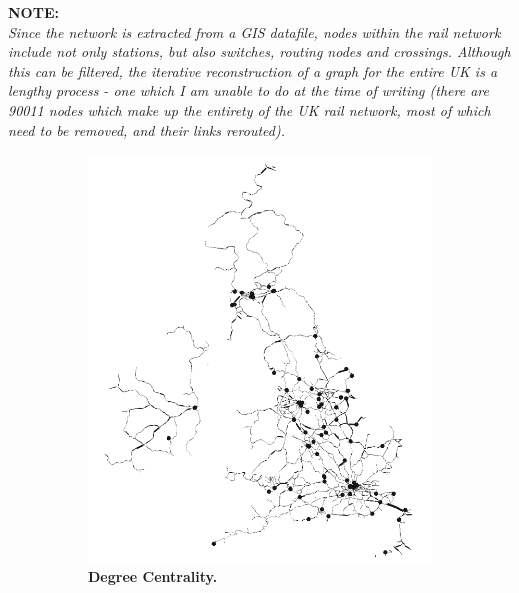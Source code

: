 \textbf{NOTE:}\\
\textit{Since the network is extracted from a GIS datafile, nodes within the rail network include not only stations, but also switches, routing nodes and crossings. Although this can be filtered, the iterative reconstruction of a graph for the entire UK is a lengthy process - one which I am unable to do at the time of writing (there are 90011 nodes which make up the entirety of the UK rail network, most of which need to be removed, and their links rerouted).}


\begin{figure}[H]
     \centering
\begin{subfigure}[b]{.49\textwidth}
     \centering
         \includegraphics[width=\textwidth]{rail/degree.png}
        \caption{ \textbf{Degree Centrality.}}
\end{subfigure}
\begin{subfigure}[b]{.49\textwidth}
     \centering

\end{subfigure}
\end{figure}
